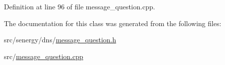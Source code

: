 Definition at line 96 of file message\-\_\-question.\-cpp.



The documentation for this class was generated from the following files\-:\begin{DoxyCompactItemize}
\item 
src/senergy/dns/\hyperlink{message__question_8h}{message\-\_\-question.\-h}\item 
src/\hyperlink{message__question_8cpp}{message\-\_\-question.\-cpp}\end{DoxyCompactItemize}
